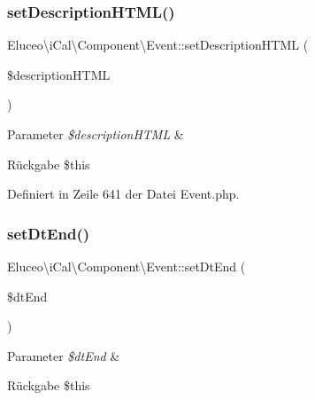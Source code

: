 \subsubsection{\texorpdfstring{set\+Description\+H\+T\+M\+L()}{setDescriptionHTML()}\hspace{0.1cm}{\footnotesize\ttfamily [3/3]}}
{\footnotesize\ttfamily Eluceo\textbackslash{}i\+Cal\textbackslash{}\+Component\textbackslash{}\+Event\+::set\+Description\+H\+T\+ML (\begin{DoxyParamCaption}\item[{}]{\$description\+H\+T\+ML }\end{DoxyParamCaption})}


\begin{DoxyParams}{Parameter}
{\em \$description\+H\+T\+ML} & \\
\hline
\end{DoxyParams}
\begin{DoxyReturn}{Rückgabe}
\$this 
\end{DoxyReturn}


Definiert in Zeile 641 der Datei Event.\+php.

\mbox{\label{class_eluceo_1_1i_cal_1_1_component_1_1_event_a89e2bf9ddc7f1ea8f4ddce0d287d0b6e}} 
\subsubsection{\texorpdfstring{set\+Dt\+End()}{setDtEnd()}\hspace{0.1cm}{\footnotesize\ttfamily [1/3]}}
{\footnotesize\ttfamily Eluceo\textbackslash{}i\+Cal\textbackslash{}\+Component\textbackslash{}\+Event\+::set\+Dt\+End (\begin{DoxyParamCaption}\item[{}]{\$dt\+End }\end{DoxyParamCaption})}


\begin{DoxyParams}{Parameter}
{\em \$dt\+End} & \\
\hline
\end{DoxyParams}
\begin{DoxyReturn}{Rückgabe}
\$this 
\end{DoxyReturn}


